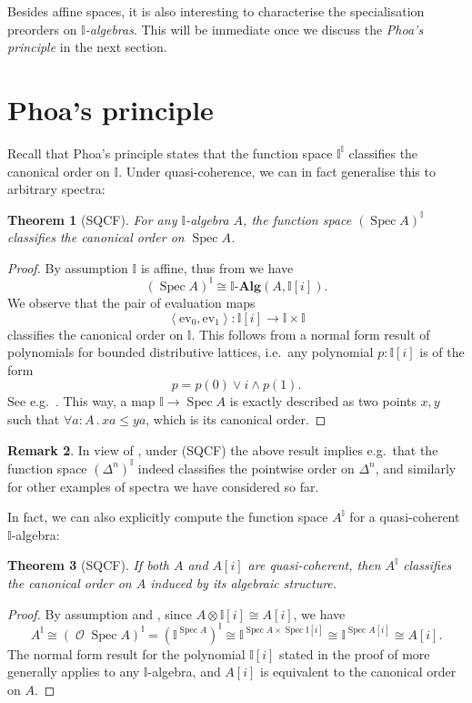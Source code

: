 \documentclass[a4paper,12pt]{amsart}
\newtheorem{theorem}{Theorem}[section]
\theoremstyle{definition}
\newtheorem{remark}[theorem]{Remark}
\newcommand{\mc}[1]{\mathcal{#1}}
\newcommand{\mb}[1]{\mathbf{#1}}
\newcommand{\mbb}[1]{\mathbb{#1}}
\newcommand{\I}{\mbb I}
\newcommand{\alg}{\text{-}\mb{Alg}}
\newcommand{\pair}[1]{\left\langle#1\right\rangle}
\newcommand{\ev}{\mathrm{ev}}
\newcommand{\fa}[2]{\forall #1\!\colon\!\!#2\mathpunct{.}}
\newcommand{\spec}{\operatorname{Spec}}
\newcommand{\opens}{\operatorname{\mc{O}}} %
\begin{document}
Besides affine spaces, it is also interesting to characterise the specialisation preorders on \emph{$\I$-algebras}. This will be immediate once we discuss the \emph{Phoa's principle} in the next section.

\section{Phoa's principle}

Recall that Phoa's principle states that the function space $\I^\I$ classifies the canonical order on $\I$. Under quasi-coherence, we can in fact generalise this to arbitrary spectra:

\begin{theorem}[SQCF]\label{thm:phoaaffine}
  For any $\I$-algebra $A$, the function space ${(\spec A)}^\I$ classifies the canonical order on $\spec A$.
\end{theorem}
\begin{proof}
  By assumption $\I$ is affine, thus from  we have
  \[ (\spec A)^\I \cong \I\alg(A,\I[i]). \]
  We observe that the pair of evaluation maps
  \[ \pair{\ev_0,\ev_1} : \I[i] \to \I \times \I \]
  classifies the canonical order on $\I$. This follows from a normal form result of polynomials for bounded distributive lattices, i.e.\ any polynomial $p:\I[i]$ is of the form 
  \[ p = p(0) \vee i \wedge p(1). \]
  See e.g.\ \citet[Thm.\ 10.11]{lausch2000algebra}. This way, a map $\I \to \spec A$ is exactly described as two points $x,y$ such that $\fa aA xa \le ya$, which is its canonical order.
\end{proof}

\begin{remark}
  In view of , under (SQCF) the above result implies e.g.\ that the function space $(\Delta^n)^\I$ indeed classifies the pointwise order on $\Delta^n$, and similarly for other examples of spectra we have considered so far.
\end{remark}

In fact, we can also explicitly compute the function space $A^\I$ for a quasi-coherent $\I$-algebra:

\begin{theorem}[SQCF]\label{thm:algebraphoa}
  If both $A$ and $A[i]$ are quasi-coherent, then $A^\I$ classifies the canonical order on $A$ induced by its algebraic structure.
\end{theorem}
\begin{proof}
  By assumption and , since $A \otimes \I[i] \cong A[i]$, we have
  \[ A^\I \cong (\opens{\spec A})^\I = (\I^{\spec A})^\I \cong \I^{\spec A \times \spec\I[i]} \cong \I^{\spec A[i]} \cong A[i]. \]
  The normal form result for the polynomial $\I[i]$ stated in the proof of  more generally applies to any $\I$-algebra, and $A[i]$ is equivalent to the canonical order on $A$.
\end{proof}
\end{document}
